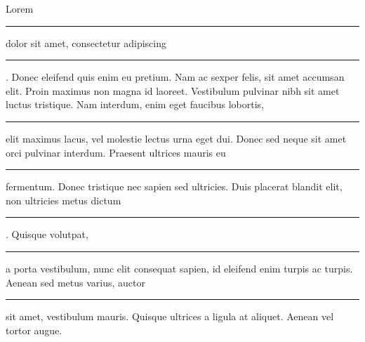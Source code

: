 \documentclass[11pt,a4paper,twoside]{book}
\begin{document}
Lorem \rule{2ex}{0.4pt} dolor sit amet, consectetur adipiscing \rule{2ex}{0.4pt}. Donec eleifend quis enim eu pretium. Nam ac sexper felis, sit amet accumsan elit. Proin maximus non magna id laoreet. Vestibulum pulvinar nibh sit amet luctus tristique. Nam interdum, enim eget faucibus lobortis, \rule{2ex}{0.4pt} elit maximus lacus, vel molestie lectus urna eget dui. Donec sed neque sit amet orci pulvinar interdum. Praesent ultrices mauris eu \rule{4ex}{0.4pt} fermentum. Donec tristique nec sapien sed ultricies. Duis placerat blandit elit, non ultricies metus dictum \rule{5ex}{0.4pt}. Quisque volutpat, \rule{2ex}{0.4pt} a porta vestibulum, nunc elit consequat sapien, id eleifend enim turpis ac turpis. Aenean sed metus varius, auctor \rule{2ex}{0.4pt} sit amet, vestibulum mauris. Quisque ultrices a ligula at aliquet. Aenean vel tortor augue.
\end{document}
